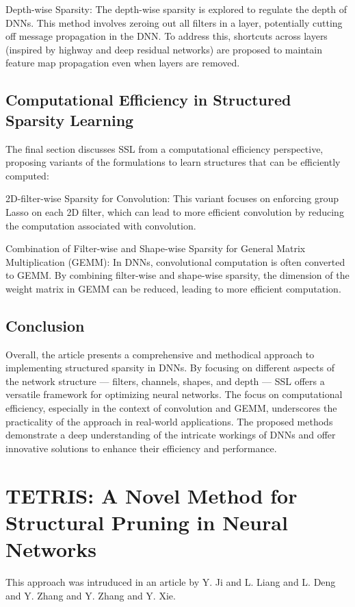 Depth-wise Sparsity: The depth-wise sparsity is explored to regulate the depth of DNNs. This method involves zeroing out all filters in a layer, potentially cutting off message propagation in the DNN. To address this, shortcuts across layers (inspired by highway and deep residual networks) are proposed to maintain feature map propagation even when layers are removed.

\subsection{Computational Efficiency in Structured Sparsity Learning}

The final section discusses SSL from a computational efficiency perspective, proposing variants of the formulations to learn structures that can be efficiently computed:

2D-filter-wise Sparsity for Convolution: This variant focuses on enforcing group Lasso on each 2D filter, which can lead to more efficient convolution by reducing the computation associated with convolution.

Combination of Filter-wise and Shape-wise Sparsity for General Matrix Multiplication (GEMM): In DNNs, convolutional computation is often converted to GEMM. By combining filter-wise and shape-wise sparsity, the dimension of the weight matrix in GEMM can be reduced, leading to more efficient computation.

\subsection{Conclusion}

Overall, the article presents a comprehensive and methodical approach to implementing structured sparsity in DNNs. By focusing on different aspects of the network structure — filters, channels, shapes, and depth — SSL offers a versatile framework for optimizing neural networks. The focus on computational efficiency, especially in the context of convolution and GEMM, underscores the practicality of the approach in real-world applications. The proposed methods demonstrate a deep understanding of the intricate workings of DNNs and offer innovative solutions to enhance their efficiency and performance.

\section{TETRIS: A Novel Method for Structural Pruning in Neural Networks}
\label{tetris}
This approach was intruduced in an article \cite{tetris} by Y. Ji and L. Liang and L. Deng and Y. Zhang and Y. Zhang and Y. Xie.

